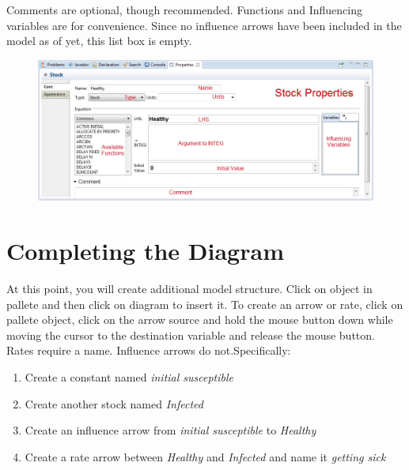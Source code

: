 \documentclass[11pt]{amsart}
\begin{document}
Comments are optional, though recommended.  Functions and Influencing variables are for convenience. Since no influence arrows have been included in the model as of yet, this list box is empty.






\begin{figure}[ht]
\begin{center}
\vspace{.2in}
\centerline {
\includegraphics[totalheight=0.4\textheight]{images/013.jpg}
}
\caption{}
\label{fig:013}
\end{center}
\end{figure}

\clearpage

\section{Completing the Diagram}
At this point, you will create additional model structure. Click on object in pallete and then click on diagram to insert it. To create an arrow or rate, click on pallete object, click on the arrow source and hold the mouse button down while moving the cursor to the destination variable and release the mouse button. Rates require a name. Influence arrows do not.Specifically:

\begin{enumerate}
\item Create a constant named \textit{initial susceptible}
\item Create another stock named \textit{Infected}
\item Create an influence arrow from \textit{initial susceptible} to \textit{Healthy}
\item Create a rate arrow between \textit{Healthy} and \textit{Infected} and name it \textit{getting sick}
\end{enumerate}
\vspace{.2in}
\end{document}
